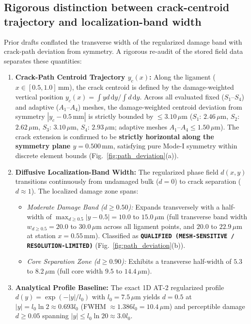 \subsection{Rigorous distinction between crack-centroid trajectory and localization-band width}
Prior drafts conflated the transverse width of the regularized damage band with crack-path deviation from symmetry. A rigorous re-audit of the stored field data separates these quantities:
\begin{enumerate}
  \item \textbf{Crack-Path Centroid Trajectory $y_c(x)$:} Along the ligament ($x \in [0.5, 1.0]\,\mathrm{mm}$), the crack centroid is defined by the damage-weighted vertical position $y_c(x) = \int y d\,\mathrm{d}y / \int d\,\mathrm{d}y$. Across all evaluated fixed ($S_1$--$S_4$) and adaptive ($A_1$--$A_4$) meshes, the damage-weighted centroid deviation from symmetry $|y_c - 0.5\,\mathrm{mm}|$ is strictly bounded by $\le 3.10\,\mu\mathrm{m}$ ($S_1$: $2.46\,\mu\mathrm{m}$, $S_2$: $2.62\,\mu\mathrm{m}$, $S_3$: $3.10\,\mu\mathrm{m}$, $S_4$: $2.93\,\mu\mathrm{m}$; adaptive meshes $A_1$--$A_4 \le 1.50\,\mu\mathrm{m}$). The crack extension is confirmed to be \textbf{strictly horizontal along the symmetry plane $y = 0.500\,\mathrm{mm}$}, satisfying pure Mode-I symmetry within discrete element bounds (Fig.~\ref{fig:path_deviation}(a)).
  \item \textbf{Diffusive Localization-Band Width:} The regularized phase field $d(x, y)$ transitions continuously from undamaged bulk ($d=0$) to crack separation ($d \approx 1$). The localized damage zone spans:
    \begin{itemize}
      \item \textit{Moderate Damage Band ($d \ge 0.50$):} Expands transversely with a half-width of $\max_{d \ge 0.5} |y - 0.5| = 10.0$ to $15.0\,\mu\mathrm{m}$ (full transverse band width $w_{d \ge 0.5} = 20.0$ to $30.0\,\mu\mathrm{m}$ across all ligament points, and $20.0$ to $22.9\,\mu\mathrm{m}$ at station $x = 0.55\,\mathrm{mm}$). Classified as \textbf{\texttt{QUALIFIED (MESH-SENSITIVE / RESOLUTION-LIMITED)}} (Fig.~\ref{fig:path_deviation}(b)).
      \item \textit{Core Separation Zone ($d \ge 0.90$):} Exhibits a transverse half-width of $5.3$ to $8.2\,\mu\mathrm{m}$ (full core width $9.5$ to $14.4\,\mu\mathrm{m}$).
    \end{itemize}
  \item \textbf{Analytical Profile Baseline:} The exact 1D AT-2 regularized profile $d(y) = \exp(-|y|/l_0)$ with $l_0 = 7.5\,\mu\mathrm{m}$ yields $d = 0.5$ at $|y| = l_0 \ln 2 \approx 0.693 l_0$ (FWHM $\approx 1.386 l_0 = 10.4\,\mu\mathrm{m}$) and perceptible damage $d \ge 0.05$ spanning $|y| \le l_0 \ln 20 \approx 3.0 l_0$.
\end{enumerate}

